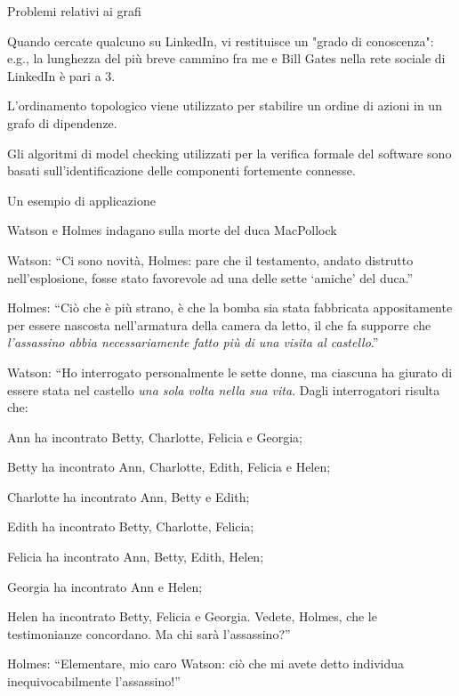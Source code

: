 \begin{frame}{Problemi relativi ai grafi}

\vspace{-9pt}

\begin{myboxtitle}[Esempi]
\BIL
\item Quando cercate qualcuno su LinkedIn, vi restituisce un "grado di conoscenza": e.g., la lunghezza del più breve cammino fra me e Bill Gates nella rete sociale di LinkedIn è pari a 3.
\item L'ordinamento topologico viene utilizzato per stabilire un ordine di azioni in un grafo di dipendenze.
\item Gli algoritmi di model checking utilizzati per la verifica formale 
del software sono basati sull'identificazione delle componenti fortemente
connesse.
\EIL
\end{myboxtitle}
\end{frame}

\begin{frame}[shrink=20]{Un esempio di applicazione}

Watson e Holmes indagano sulla morte del duca MacPollock
\BIL
\item \alert{Watson}:
``Ci sono novità, Holmes: pare che il testamento,
andato distrutto nell'esplosione, fosse stato favorevole
ad una delle sette `amiche' del duca.''
\item \alert{Holmes}:
``Ciò che è
più strano, è che la bomba sia stata fabbricata
appositamente per essere nascosta nell'armatura della camera da
letto, il che fa supporre che \textit{l'assassino
abbia necessariamente fatto più di una visita al castello}.''
\item \alert{Watson}:
``Ho interrogato personalmente
le sette donne, ma ciascuna ha giurato di essere stata nel
castello \textit{una sola volta nella sua vita}.
Dagli interrogatori risulta che:
\BI
\item
Ann ha incontrato Betty, Charlotte, Felicia e Georgia;
\item
Betty ha incontrato Ann, Charlotte, Edith, Felicia e Helen;
\item
Charlotte ha incontrato Ann, Betty e Edith;
\item
Edith ha incontrato Betty, Charlotte, Felicia;
\item
Felicia ha incontrato Ann, Betty, Edith, Helen;
\item
Georgia ha incontrato Ann e Helen;
\item
Helen ha incontrato Betty, Felicia e Georgia.
\EI
Vedete, Holmes, che le testimonianze concordano. Ma chi sarà l'assassino?''
\item \alert{Holmes}:
``Elementare, mio caro Watson: ciò che mi avete detto individua
inequivocabilmente l'assassino!''
\EIL

\end{frame}

